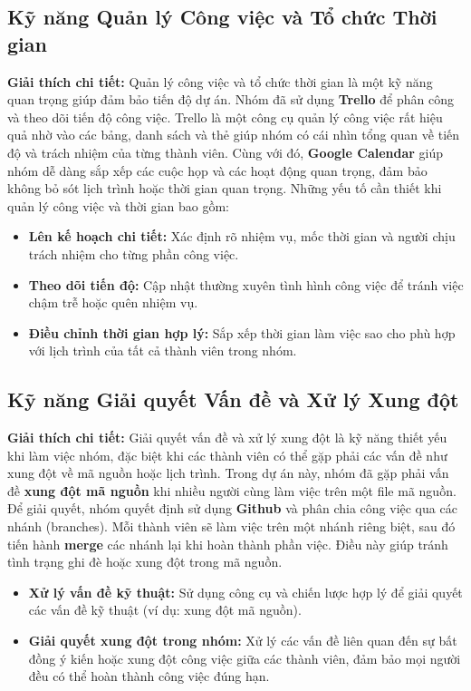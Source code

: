 \documentclass[a4paper,12pt]{article}
\begin{document}
\subsection{Kỹ năng Quản lý Công việc và Tổ chức Thời gian}
\textbf{Giải thích chi tiết:}  
Quản lý công việc và tổ chức thời gian là một kỹ năng quan trọng giúp đảm bảo tiến độ dự án. Nhóm đã sử dụng \textbf{Trello} để phân công và theo dõi tiến độ công việc. Trello là một công cụ quản lý công việc rất hiệu quả nhờ vào các bảng, danh sách và thẻ giúp nhóm có cái nhìn tổng quan về tiến độ và trách nhiệm của từng thành viên. Cùng với đó, \textbf{Google Calendar} giúp nhóm dễ dàng sắp xếp các cuộc họp và các hoạt động quan trọng, đảm bảo không bỏ sót lịch trình hoặc thời gian quan trọng. Những yếu tố cần thiết khi quản lý công việc và thời gian bao gồm:
\begin{itemize}
    \item \textbf{Lên kế hoạch chi tiết:} Xác định rõ nhiệm vụ, mốc thời gian và người chịu trách nhiệm cho từng phần công việc.
    \item \textbf{Theo dõi tiến độ:} Cập nhật thường xuyên tình hình công việc để tránh việc chậm trễ hoặc quên nhiệm vụ.
    \item \textbf{Điều chỉnh thời gian hợp lý:} Sắp xếp thời gian làm việc sao cho phù hợp với lịch trình của tất cả thành viên trong nhóm.
\end{itemize}

\subsection{Kỹ năng Giải quyết Vấn đề và Xử lý Xung đột}
\textbf{Giải thích chi tiết:}  
Giải quyết vấn đề và xử lý xung đột là kỹ năng thiết yếu khi làm việc nhóm, đặc biệt khi các thành viên có thể gặp phải các vấn đề như xung đột về mã nguồn hoặc lịch trình. Trong dự án này, nhóm đã gặp phải vấn đề \textbf{xung đột mã nguồn} khi nhiều người cùng làm việc trên một file mã nguồn. Để giải quyết, nhóm quyết định sử dụng \textbf{Github} và phân chia công việc qua các nhánh (branches). Mỗi thành viên sẽ làm việc trên một nhánh riêng biệt, sau đó tiến hành \textbf{merge} các nhánh lại khi hoàn thành phần việc. Điều này giúp tránh tình trạng ghi đè hoặc xung đột trong mã nguồn.
\begin{itemize}
    \item \textbf{Xử lý vấn đề kỹ thuật:} Sử dụng công cụ và chiến lược hợp lý để giải quyết các vấn đề kỹ thuật (ví dụ: xung đột mã nguồn).
    \item \textbf{Giải quyết xung đột trong nhóm:} Xử lý các vấn đề liên quan đến sự bất đồng ý kiến hoặc xung đột công việc giữa các thành viên, đảm bảo mọi người đều có thể hoàn thành công việc đúng hạn.
\end{itemize}
\end{document}
